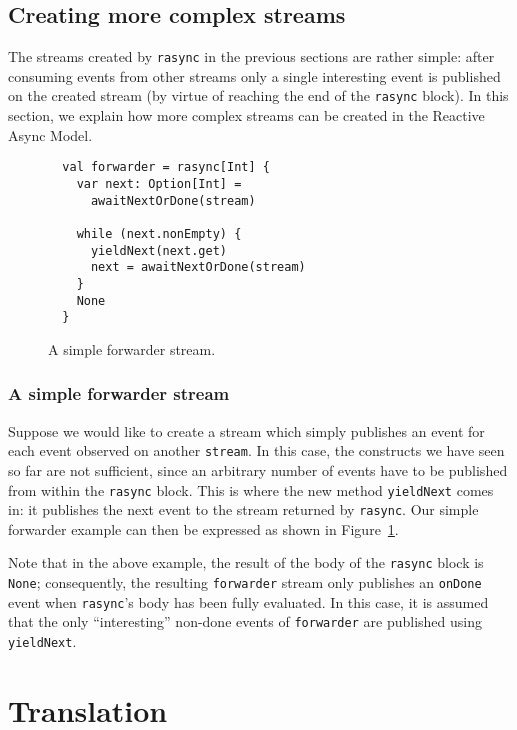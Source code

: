 \documentclass{acm_proc_article-sp}
\begin{document}
\subsection{Creating more complex streams}

The streams created by \verb|rasync| in the previous sections are rather
simple: after consuming events from other streams only a single interesting
event is published on the created stream (by virtue of reaching the end of the
\verb|rasync| block). In this section, we explain how more complex streams can
be created in the Reactive Async Model.

\begin{figure}[ht!]
  \centering
  \begin{lstlisting}
  val forwarder = rasync[Int] {
    var next: Option[Int] =
      awaitNextOrDone(stream)

    while (next.nonEmpty) {
      yieldNext(next.get)
      next = awaitNextOrDone(stream)
    }
    None
  }
  \end{lstlisting}
  \caption{A simple forwarder stream.}
  \label{fig:forwarder}
\end{figure}

\subsubsection{A simple forwarder stream}

Suppose we would like to create a stream which simply publishes an event for
each event observed on another \verb|stream|. In this case, the constructs we
have seen so far are not sufficient, since an arbitrary number of events have
to be published from within the \verb|rasync| block. This is where the new
method \verb|yieldNext| comes in: it publishes the next event to the stream
returned by \verb|rasync|. Our simple forwarder example can then be expressed
as shown in Figure~\ref{fig:forwarder}.

Note that in the above example, the result of the body of the \verb|rasync|
block is \verb|None|; consequently, the resulting \verb|forwarder| stream only
publishes an \verb|onDone| event when \verb|rasync|'s body has been fully
evaluated. In this case, it is assumed that the only ``interesting'' non-done
events of \verb|forwarder| are published using \verb|yieldNext|.

\section{Translation}\label{sec:translation}
\end{document}
